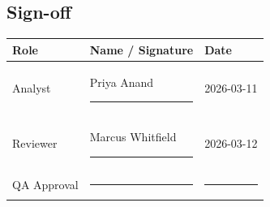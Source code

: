 \subsection{Sign-off}
\begin{center}
\begin{tabularx}{\linewidth}{@{}Y Y Y@{}}
\toprule
{}
{\color{white}\bfseries Role} & {\color{white}\bfseries Name / Signature} & {\color{white}\bfseries Date} \\
\midrule
Analyst & Priya Anand \rule{2.6cm}{0.4pt} & 2026-03-11 \\[10pt]
Reviewer & Marcus Whitfield \rule{2.6cm}{0.4pt} & 2026-03-12 \\[10pt]
QA Approval & \rule{4.2cm}{0.4pt} & \rule{2.6cm}{0.4pt} \\
\bottomrule
\end{tabularx}
\end{center}
